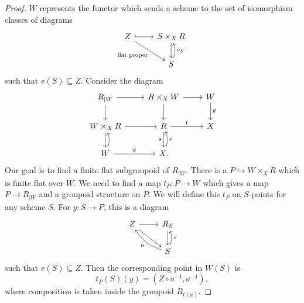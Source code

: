 \documentclass{amsart}
\theoremstyle{definition}
\theoremstyle{remark}
\theoremstyle{plain}
\theoremstyle{definition}
\theoremstyle{remark}
\newcommand{\1}{\mathbf{1}}
\newcommand{\2}{\mathbf{2}}
\newcommand{\3}{\mathbf{3}}
\begin{document}
\begin{proof}
    \(W\) represents the functor which sends a scheme to the set of isomorphism classes of diagrams
    \begin{equation*}
    \begin{tikzcd}
        Z \ar[hookrightarrow]{r} \ar{dr}[swap]{\text{flat proper}} & S \times_{X} R \ar{d} \\
        & S \ar[bend right=20]{u}[swap]{e_S}
    \end{tikzcd}
    \end{equation*}
    such that \(e(S) \subseteq Z\). Consider the diagram
    \begin{equation*}
    \begin{tikzcd}
        R_{|W} \ar{r} \ar{d} & R \times_X W \ar{r} \ar{d} & W \ar{d}{g} \\
        W \times_X R \ar{r} \ar{d} & R \ar{d}[swap]{s} \ar{r}{t} & X \\
        W \ar{r}{g} \ar[bend right=20]{u} & X \ar[bend right=20]{u}[swap]{e}.
    \end{tikzcd}
    \end{equation*}
    Our goal is to find a finite flat subgroupoid of \(R_{|W}\). There is a \(P \hookrightarrow W \times_X R\) which is finite flat over \(W\). We need to find a map \(t_P \colon P \to W\) which gives a map \(P \to R_{|W}\) and a groupoid structure on \(P\). We will define this \(t_P\) on \(S\)-points for any scheme \(S\). For \(y \colon S \to P\), this is a diagram
    \begin{equation*}
    \begin{tikzcd}
        Z \ar{r} \ar{dr} & R_S \ar{d} \\
        & S \ar[bend left=20]{ul}{a} \ar[bend right=20]{u}[swap]{e}
    \end{tikzcd}
    \end{equation*}
    such that \(e(S) \subseteq Z\). Then the corresponding point in \(W(S)\) is
    \[ t_P(S)(y) = (Z \circ a^{-1}, a^{-1}), \]
    where composition is taken inside the groupoid \(R_{t(a)}\).


\end{proof}
\end{document}
